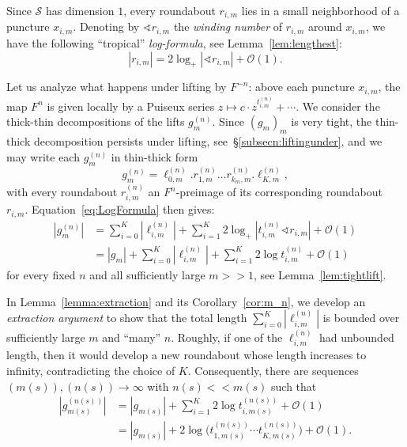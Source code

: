 \documentclass{amsart}
\theoremstyle{definition}
\theoremstyle{remark}
\newcommand{\cS}{\mathcal{S}}
\renewcommand\gg{>\!\!>}
\renewcommand\ll{<\!\!<}
\begin{document}
Since $\cS$ has dimension $1$, every roundabout $r_{i,m}$ lies in a small neighborhood of a puncture $x_{i,m}$. Denoting by $\sphericalangle  r_{i,m}$ the \emph{winding number} of $r_{i,m}$ around $x_{i,m}$, we have the following ``tropical'' \emph{log-formula}, see Lemma~\ref{lem:lengthest}:
\begin{equation}\label{eq:LogFormula}
  |r_{i,m}|=2\log_+|\sphericalangle  r_{i,m}| + \mathcal O(1). 
\end{equation} 

Let us analyze what happens under lifting by $F^{-n}$: above each puncture $x_{i,m}$, the map $F^n$ is given locally by a Puiseux series $z \mapsto c\cdot z^{t^{(n)}_{i,m}}+\cdots$. 
We consider the thick-thin decompositions of the lifts $g_m^{(n)}$. Since $(g_m)_m$ is very tight, the thin-thick decomposition persists under lifting, see~\S\ref{subsecn:liftingunder}, and we may write each $g_m^{(n)}$ in thin-thick form
\begin{equation}\label{eq:persistence}
  g_m^{(n)}=\ell_{0,m}^{(n)}.r_{1,m}^{(n)} \ldots r_{k_m,m}^{(n)}.\ell_{K,m}^{(n)},
\end{equation}
with every roundabout $r_{i,m}^{(n)}$ an $F^n$-preimage of its corresponding roundabout $r_{i,m}$. Equation~\eqref{eq:LogFormula} then gives:
\begin{equation}\label{eq:before_extraction}
\begin{aligned}
  |g_m^{(n)}|&=\sum_{i=0}^K|\ell_{i,m}^{(n)}|+\sum_{i=1}^K2\log_+|t_{i,m}^{(n)}\sphericalangle r_{i,m}|+\mathcal O(1)\\
  &=|g_m| + \sum_{i=0}^K|\ell_{i,m}^{(n)}| + \sum_{i=1}^K2\log t_{i,m}^{(n)}+\mathcal O(1)
\end{aligned}
\end{equation}
for every fixed $n$ and all sufficiently large $m \gg 1$, see Lemma~\ref{lem:tightlift}.
 
In Lemma~\ref{lemma:extraction} and its Corollary~\ref{cor:m_n}, we develop an \emph{extraction argument} to show that the total length $\sum_{i=0}^K|\ell_{i,m}^{(n)}|$ is bounded over sufficiently large $m$ and ``many'' $n$. Roughly, if one of the $\ell_{i,m}^{(n)}$ had unbounded length, then it would develop a new roundabout whose length increases to infinity, contradicting the choice of $K$. Consequently, there are sequences $(m(s)),(n(s))\to \infty$ with $n(s)\ll m(s)$ such that  
\begin{equation}\label{eq:extraction}
  \begin{aligned}
    |g_{m(s)}^{(n(s))}|&=|g_{m(s)}|+\sum_{i=1}^K2\log t_{i,{m(s)}}^{(n(s))}+\mathcal O(1)\\
    &=|g_{m(s)}|+2\log\Big(t_{1,{m(s)}}^{(n(s))}\cdots t_{K,{m(s)}}^{(n(s))}\Big)+\mathcal O(1).
  \end{aligned}
\end{equation}
\end{document}
